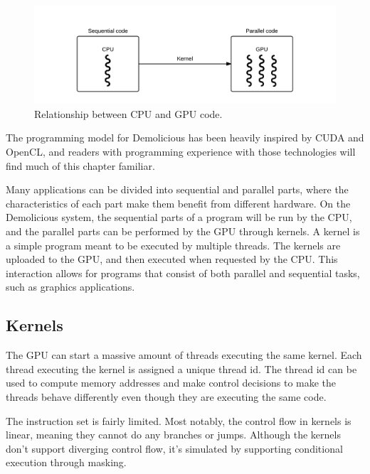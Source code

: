 \documentclass[../main/report.tex]{subfiles}
\begin{document}
\begin{figure}[H]
	\centering
	\includegraphics[width=\textwidth]{../system_overview/diagrams/programming_model_cpu_gpu.png}
	\caption{Relationship between CPU and GPU code.}
	\label{fig:programming_model_cpu_gpu}
\end{figure}

The programming model for Demolicious has been heavily inspired by CUDA and OpenCL, 
and readers with programming experience with those technologies will find much of this chapter familiar.

Many applications can be divided into sequential and parallel parts,
where the characteristics of each part make them benefit from different hardware.
On the Demolicious system, the sequential parts of a program will be run by the CPU, and the parallel parts can be performed by the GPU through kernels.
A kernel is a simple program meant to be executed by multiple threads.
The kernels are uploaded to the GPU, and then executed when requested by the CPU.
This interaction allows for programs that consist of both parallel and sequential tasks, such as graphics applications.

\subsection{Kernels}
The GPU can start a massive amount of threads executing the same kernel.
Each thread executing the kernel is assigned a unique thread id.
The thread id can be used to compute memory addresses and make control decisions
to make the threads behave differently even though they are executing the same code. 

The instruction set is fairly limited.
Most notably, the control flow in kernels is linear, meaning they cannot do any branches or jumps.
Although the kernels don't support diverging control flow,
it's simulated by supporting conditional execution through masking.
\end{document}
